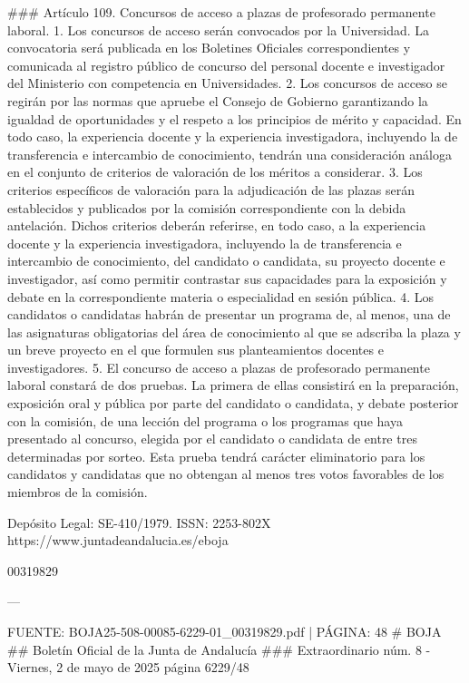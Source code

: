 \documentclass{article}
\begin{document}
\begin{itemize}
\begin{itemize}
\begin{scriptsize}
                  \#\#\# Artículo 109. Concursos de acceso a plazas de profesorado permanente laboral.
                  1. Los concursos de acceso serán convocados por la Universidad. La convocatoria será publicada en los Boletines Oficiales correspondientes y comunicada al registro público de concurso del personal docente e investigador del Ministerio con competencia en Universidades.
                  2. Los concursos de acceso se regirán por las normas que apruebe el Consejo de Gobierno garantizando la igualdad de oportunidades y el respeto a los principios de mérito y capacidad. En todo caso, la experiencia docente y la experiencia investigadora, incluyendo la de transferencia e intercambio de conocimiento, tendrán una consideración análoga en el conjunto de criterios de valoración de los méritos a considerar.
                  3. Los criterios específicos de valoración para la adjudicación de las plazas serán establecidos y publicados por la comisión correspondiente con la debida antelación. Dichos criterios deberán referirse, en todo caso, a la experiencia docente y la experiencia investigadora, incluyendo la de transferencia e intercambio de conocimiento, del candidato o candidata, su proyecto docente e investigador, así como permitir contrastar sus capacidades para la exposición y debate en la correspondiente materia o especialidad en sesión pública.
                  4. Los candidatos o candidatas habrán de presentar un programa de, al menos, una de las asignaturas obligatorias del área de conocimiento al que se adscriba la plaza y un breve proyecto en el que formulen sus planteamientos docentes e investigadores.
                  5. El concurso de acceso a plazas de profesorado permanente laboral constará de dos pruebas. La primera de ellas consistirá en la preparación, exposición oral y pública por parte del candidato o candidata, y debate posterior con la comisión, de una lección del programa o los programas que haya presentado al concurso, elegida por el candidato o candidata de entre tres determinadas por sorteo. Esta prueba tendrá carácter eliminatorio para los candidatos y candidatas que no obtengan al menos tres votos favorables de los miembros de la comisión.

                  Depósito Legal: SE-410/1979. ISSN: 2253-802X https://www.juntadeandalucia.es/eboja

                  00319829

                  ---

                  FUENTE: BOJA25-508-00085-6229-01\_00319829.pdf | PÁGINA: 48
                  \# BOJA
                  \#\# Boletín Oficial de la Junta de Andalucía
                  \#\#\# Extraordinario núm. 8 - Viernes, 2 de mayo de 2025
                  página 6229/48


\end{scriptsize}
\end{itemize}
\end{itemize}
\end{document}
